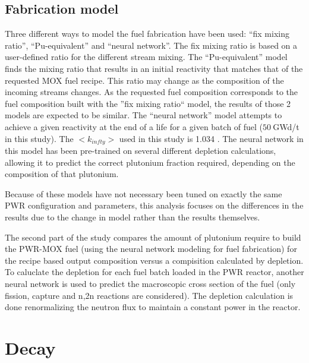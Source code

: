 \documentclass{anstrans}
\begin{document}
\subsection{Fabrication model}
Three different ways to model the fuel fabrication have been used: ``fix mixing
ratio'', ``Pu-equivalent'' and ``neural network''.
The fix mixing ratio is based on a user-defined ratio for the different stream mixing. The
``Pu-equivalent'' model finds the mixing ratio that results in an initial reactivity
that matches that of the requested MOX fuel recipe.  This ratio may change as the 
composition of the incoming streams changes.  As the requested fuel
composition corresponds to the fuel composition built with the ''fix mixing
ratio`` model, the results of those 2 models are expected to be similar.
The ``neural network'' model attempts to achieve a given reactivity at the end of a 
life for a given batch of fuel ($50~$GWd/t in this study). The
$<k_{infty}>$ used in this study is 1.034 \cite{???}. The neural network in this
model has been pre-trained on several different depletion calculations,
allowing it to predict the correct plutonium fraction required, depending
on the composition of that plutonium.


Because of these models have not necessary been tuned on exactly the same
PWR configuration and parameters, this analysis focuses on the differences
in the results due to the change in model rather than the results themselves.

The second part of the study compares the amount of plutonium require to build
the PWR-MOX fuel (using the neural network modeling for fuel fabrication) for
the recipe based output composition versus a compisition calculated by depletion.
To caluclate the depletion for each fuel batch loaded in the PWR reactor, another 
neural network is used to predict the macroscopic cross section of the
fuel \cite{NN_CLASS} (only fission, capture and n,2n reactions are considered). The
depletion calculation is done renormalizing the neutron flux to maintain a
constant power in the reactor.

\section{Decay}
\end{document}
